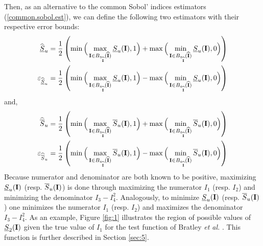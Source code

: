 Then, as an alternative to the common Sobol' indices estimators (\ref{common.sobol.est}), we can define the following two estimators with their respective error bounds:
\begin{gather}
\begin{aligned}
\widehat{\underline{S}}_u & = \frac{1}{2}\left(\min\Big{(}\max_{\boldsymbol{\mathbf{I}}\in B_{\varepsilon_{\widehat{\boldsymbol{\mathbf{I}}}}}(\widehat{\boldsymbol{\mathbf{I}}})} \underline{S}_u(\boldsymbol{\mathbf{I}}),1\Big{)} + \max\Big{(}\min_{\boldsymbol{\mathbf{I}}\in B_{\varepsilon_{\widehat{\boldsymbol{\mathbf{I}}}}}(\widehat{\boldsymbol{\mathbf{I}}})} \underline{S}_u(\boldsymbol{\mathbf{I}}),0\Big{)} \right) \\
\varepsilon_{\widehat{\underline{S}}_u} & = \frac{1}{2}\left(\min\Big{(}\max_{\boldsymbol{\mathbf{I}}\in B_{\varepsilon_{\widehat{\boldsymbol{\mathbf{I}}}}}(\widehat{\boldsymbol{\mathbf{I}}})} \underline{S}_u(\boldsymbol{\mathbf{I}}),1\Big{)} - \max\Big{(}\min_{\boldsymbol{\mathbf{I}}\in B_{\varepsilon_{\widehat{\boldsymbol{\mathbf{I}}}}}(\widehat{\boldsymbol{\mathbf{I}}})} \underline{S}_u(\boldsymbol{\mathbf{I}}),0\Big{)} \right)
\end{aligned}
\label{formula_undersu}
\end{gather}
and,
\begin{gather}
\begin{aligned}
\widehat{\overline{S}}_u & = \frac{1}{2}\left(\min\Big{(}\max_{\boldsymbol{\mathbf{I}}\in B_{\varepsilon_{\widehat{\boldsymbol{\mathbf{I}}}}}(\widehat{\boldsymbol{\mathbf{I}}})} \overline{S}_u(\boldsymbol{\mathbf{I}}),1\Big{)} + \max\Big{(}\min_{\boldsymbol{\mathbf{I}}\in B_{\varepsilon_{\widehat{\boldsymbol{\mathbf{I}}}}}(\widehat{\boldsymbol{\mathbf{I}}})} \overline{S}_u(\boldsymbol{\mathbf{I}}),0\Big{)} \right) \\
\varepsilon_{\widehat{\overline{S}}_u} & = \frac{1}{2}\left(\min\Big{(}\max_{\boldsymbol{\mathbf{I}}\in B_{\varepsilon_{\widehat{\boldsymbol{\mathbf{I}}}}}(\widehat{\boldsymbol{\mathbf{I}}})} \overline{S}_u(\boldsymbol{\mathbf{I}}),1\Big{)} - \max\Big{(}\min_{\boldsymbol{\mathbf{I}}\in B_{\varepsilon_{\widehat{\boldsymbol{\mathbf{I}}}}}(\widehat{\boldsymbol{\mathbf{I}}})} \overline{S}_u(\boldsymbol{\mathbf{I}}),0\Big{)} \right)
\end{aligned}
\label{formula_oversu}
\end{gather}
Because numerator and denominator are both known to be positive, maximizing $\underline{S}_u(\boldsymbol{\mathbf{I}})$ (resp. $\overline{S}_u(\boldsymbol{\mathbf{I}})$) is done through \break maximizing the numerator $I_1$ (resp. $I_2$) and minimizing the denominator $I_3-I_4^2$. Analogously, to minimize $\underline{S}_u(\boldsymbol{\mathbf{I}})$ (resp. $\overline{S}_u(\boldsymbol{\mathbf{I}})$) one minimizes the numerator $I_1$ (resp. $I_2$) and maximizes the denominator $I_3-I_4^2$. As an example, Figure \ref{fig:1} illustrates the region of possible values of $\underline{S}_2(\boldsymbol{\mathbf{I}})$ given the true value of $I_1$ for the test function of Bratley \textit{et al.} \cite{Bratley}. This function is further described in Section \ref{sec:5}. 
